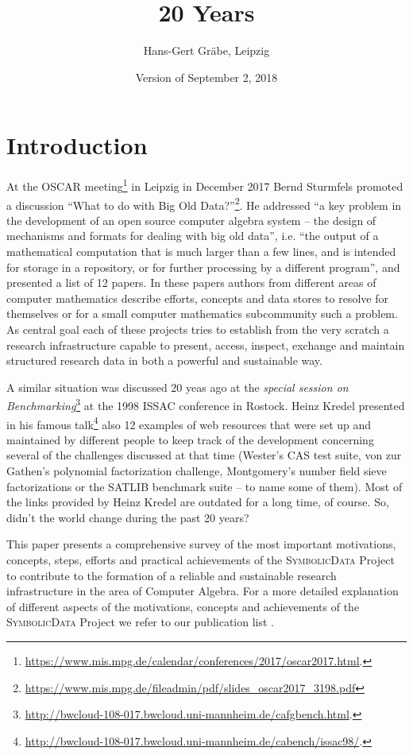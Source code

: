 \documentclass[a4paper,11pt]{article}
\title{20 Years {\SD}}
\author{Hans-Gert Gr\"abe, Leipzig}
\date{Version of September 2, 2018}
\makeatletter
\def\SD{\textsc{SymbolicData}}
\newcommand{\vorspann}{
\Aufsatz
{20 Years {\SD} Project}
{20 Years {\SD} Project}
{H.-G.\ Gr\"abe}
{graebe}
{H.-G.\ Gr\"abe, Leipzig University}
{graebe.jpg}
{graebe@informatik.uni-leipzig.de}

}
\makeatother
\begin{document}
\maketitle

\section{Introduction}

At the OSCAR
meeting\footnote{\url{https://www.mis.mpg.de/calendar/conferences/2017/oscar2017.html}.}
in Leipzig in December 2017 Bernd Sturmfels promoted a discussion ``What to do
with Big Old
Data?''\footnote{\url{https://www.mis.mpg.de/fileadmin/pdf/slides_oscar2017_3198.pdf}}.
He addressed ``a key problem in the development of an open source computer
algebra system -- the design of mechanisms and formats for dealing with big old
data'', i.e. ``the output of a mathematical computation that is much larger
than a few lines, and is intended for storage in a repository, or for further
processing by a different program'', and presented a list of 12 papers. In
these papers authors from different areas of computer mathematics describe
efforts, concepts and data stores to resolve for themselves or for a small
computer mathematics subcommunity such a problem.  As central goal each of
these projects tries to establish from the very scratch a research
infrastructure capable to present, access, inspect, exchange and maintain
structured research data in both a powerful and sustainable way.

A similar situation was discussed 20 yeas ago at the \emph{special session on
  Benchmarking}\footnote{\url{http://bwcloud-108-017.bwcloud.uni-mannheim.de/cafgbench.html}.}
at the 1998 ISSAC conference in Rostock.  Heinz Kredel presented in his famous
talk\footnote{\url{http://bwcloud-108-017.bwcloud.uni-mannheim.de/cabench/issac98/}.}
also 12 examples of web resources that were set up and maintained by different
people to keep track of the development concerning several of the challenges
discussed at that time (Wester's CAS test suite, von zur Gathen's polynomial
factorization challenge, Montgomery's number field sieve factorizations or the
SATLIB benchmark suite -- to name some of them). Most of the links provided by
Heinz Kredel are outdated for a long time, of course.  So, didn't the world
change during the past 20 years?

This paper presents a comprehensive survey of the most important motivations,
concepts, steps, efforts and practical achievements of the {\SD} Project to
contribute to the formation of a reliable and sustainable research
infrastructure in the area of Computer Algebra.  For a more detailed
explanation of different aspects of the motivations, concepts and achievements
of the {\SD} Project we refer to our publication list \cite{sdpub}.
\end{document}
